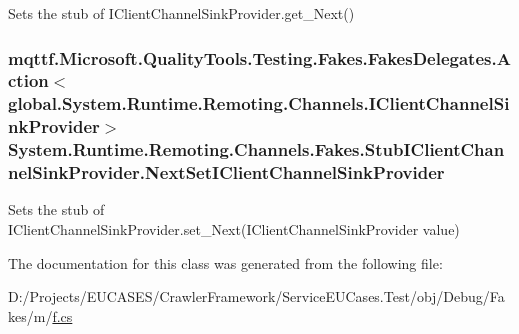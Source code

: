 Sets the stub of I\-Client\-Channel\-Sink\-Provider.\-get\-\_\-\-Next()

\hypertarget{class_system_1_1_runtime_1_1_remoting_1_1_channels_1_1_fakes_1_1_stub_i_client_channel_sink_provider_ae925c3e3c97fc4257628d16d02e49f5d}{
\subsubsection[{Next\-Set\-I\-Client\-Channel\-Sink\-Provider}]{\setlength{\rightskip}{0pt plus 5cm}mqttf.\-Microsoft.\-Quality\-Tools.\-Testing.\-Fakes.\-Fakes\-Delegates.\-Action$<$global.\-System.\-Runtime.\-Remoting.\-Channels.\-I\-Client\-Channel\-Sink\-Provider$>$ System.\-Runtime.\-Remoting.\-Channels.\-Fakes.\-Stub\-I\-Client\-Channel\-Sink\-Provider.\-Next\-Set\-I\-Client\-Channel\-Sink\-Provider}}\label{class_system_1_1_runtime_1_1_remoting_1_1_channels_1_1_fakes_1_1_stub_i_client_channel_sink_provider_ae925c3e3c97fc4257628d16d02e49f5d}


Sets the stub of I\-Client\-Channel\-Sink\-Provider.\-set\-\_\-\-Next(\-I\-Client\-Channel\-Sink\-Provider value)



The documentation for this class was generated from the following file\-:\begin{DoxyCompactItemize}
\item 
D\-:/\-Projects/\-E\-U\-C\-A\-S\-E\-S/\-Crawler\-Framework/\-Service\-E\-U\-Cases.\-Test/obj/\-Debug/\-Fakes/m/\hyperlink{m_2f_8cs}{f.\-cs}\end{DoxyCompactItemize}
